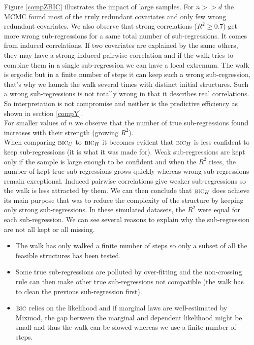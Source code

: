 \documentclass[12pt,a4paper]{report}
\begin{document}
Figure \ref{compZBIC} illustrates the impact of large samples. For $n>>d$ the MCMC found most of the truly redundant covariates and only few wrong redundant covariates. We also observe that strong correlations ($R^2\geq 0.7$) get more wrong sub-regressions for a same total number of sub-regressions. It comes from induced correlations. If two covariates are explained by the same others, they may have a strong induced pairwise correlation and if the walk tries to combine them in a single sub-regression we can have a local extremum. The walk is ergodic but in a finite number of steps it can keep such a wrong sub-regression, that's why we launch the walk several times with distinct initial structures. Such a wrong sub-regressions is not totally wrong in that it describes real correlations. So interpretation is not compromise and neither is the predictive efficiency as shown in section \ref{compY}. \\
For smaller values of $n$ we observe that the number of true sub-regressions found increases with their strength (growing $R^2$).\\
When comparing $\mbox{{\sc bic}}_U$ to $\mbox{{\sc bic}}_H$ it becomes evident that $\mbox{{\sc bic}}_H$ is less confident to keep sub-regressions (it is what it was made for). Weak sub-regressions are kept only if the sample is large enough to be confident and when the $R^2$ rises, the number of kept true sub-regressions grows quickly whereas wrong sub-regressions remain exceptional. Induced pairwise correlations give weaker sub-regressions so the walk is less attracted by them. We can then conclude that $\mbox{{\sc bic}}_H$ does achieve its main purpose that was to reduce the complexity of the structure by keeping only strong sub-regressions. In these simulated datasets, the $R^2$ were equal for each sub-regression. We can see several reasons to explain why the sub-regression are not all kept or all missing. 
\begin{itemize}
	\item The walk has only walked a finite number of steps so only a subset of all the feasible structures has been tested.
	\item Some true sub-regressions are polluted by over-fitting and the non-crossing rule can then make other true sub-regressions not compatible (the walk has to clean the previous sub-regression first).
	\item $\mbox{{\sc bic}}$ relies on the likelihood and if marginal laws are well-estimated by Mixmod, the gap between the marginal and dependent likelihood might be small and thus the walk can be slowed whereas we use a finite number of steps.
\end{itemize}
\end{document}
